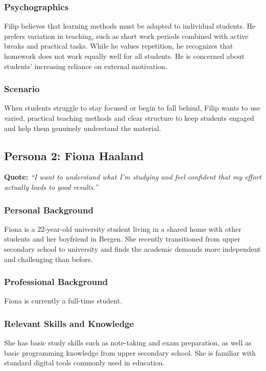 \subsubsection{Psychographics}
Filip believes that learning methods must be adapted to individual students.
He prefers variation in teaching, such as short work periods combined with active breaks and practical tasks.
While he values repetition, he recognizes that homework does not work equally well for all students.
He is concerned about students’ increasing reliance on external motivation.

\subsubsection{Scenario}
When students struggle to stay focused or begin to fall behind, Filip wants to use varied,
practical teaching methods and clear structure to keep students engaged and help them genuinely understand the material.



\subsection{Persona 2: Fiona Haaland}

\textbf{Quote:}  
\emph{“I want to understand what I’m studying and feel confident that my effort actually leads to good results.”}

\subsubsection{Personal Background}
Fiona is a 22-year-old university student living in a shared home with other students and her boyfriend in Bergen.
She recently transitioned from upper secondary school to university and finds the academic demands more independent
and challenging than before.

\subsubsection{Professional Background}
Fiona is currently a full-time student.

\subsubsection{Relevant Skills and Knowledge}
She has basic study skills such as note-taking and exam preparation, as well as basic programming knowledge
from upper secondary school.
She is familiar with standard digital tools commonly used in education.

